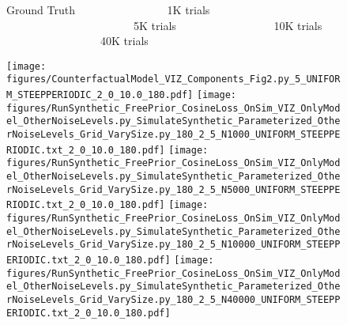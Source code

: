 \documentclass{article}
\begin{document}
\begin{figure}
\begin{comment}
python3 RunSynthetic_FreePrior_CosineLoss_OnSim_VIZ_OnlyModel_OtherNoiseLevels.py 2 0 10.0 180 SimulateSynthetic_Parameterized_OtherNoiseLevels_Grid_VarySize.py_180_2_3_N1000_STEEPPERIODIC_STEEPPERIODIC.txt
python3 RunSynthetic_FreePrior_CosineLoss_OnSim_VIZ_OnlyModel_OtherNoiseLevels.py 2 0 10.0 180 SimulateSynthetic_Parameterized_OtherNoiseLevels_Grid_VarySize.py_180_2_3_N5000_STEEPPERIODIC_STEEPPERIODIC.txt
python3 RunSynthetic_FreePrior_CosineLoss_OnSim_VIZ_OnlyModel_OtherNoiseLevels.py 2 0 10.0 180 SimulateSynthetic_Parameterized_OtherNoiseLevels_Grid_VarySize.py_180_2_3_N10000_STEEPPERIODIC_STEEPPERIODIC.txt
python3 RunSynthetic_FreePrior_CosineLoss_OnSim_VIZ_OnlyModel_OtherNoiseLevels.py 2 0 10.0 180 SimulateSynthetic_Parameterized_OtherNoiseLevels_Grid_VarySize.py_180_2_3_N40000_STEEPPERIODIC_STEEPPERIODIC.txt


python3 RunSynthetic_FreePrior_CosineLoss_OnSim_VIZ_OnlyModel_OtherNoiseLevels.py 2 0 10.0 180 SimulateSynthetic_Parameterized_OtherNoiseLevels_Grid_VarySize.py_180_2_2_N1000_STEEPPERIODIC_STEEPPERIODIC.txt
python3 RunSynthetic_FreePrior_CosineLoss_OnSim_VIZ_OnlyModel_OtherNoiseLevels.py 2 0 10.0 180 SimulateSynthetic_Parameterized_OtherNoiseLevels_Grid_VarySize.py_180_2_2_N5000_STEEPPERIODIC_STEEPPERIODIC.txt
python3 RunSynthetic_FreePrior_CosineLoss_OnSim_VIZ_OnlyModel_OtherNoiseLevels.py 2 0 10.0 180 SimulateSynthetic_Parameterized_OtherNoiseLevels_Grid_VarySize.py_180_2_2_N10000_STEEPPERIODIC_STEEPPERIODIC.txt
python3 RunSynthetic_FreePrior_CosineLoss_OnSim_VIZ_OnlyModel_OtherNoiseLevels.py 2 0 10.0 180 SimulateSynthetic_Parameterized_OtherNoiseLevels_Grid_VarySize.py_180_2_2_N40000_STEEPPERIODIC_STEEPPERIODIC.txt



\end{comment}
\centering

Ground Truth
  \ \  \ \ \ \  \ \  \ \ \ \ \ \ \ \ 
 1K trials
  \ \  \ \  \ \  \ \ \ \ \ \ \ \ \ \ \ \ \ \ \ \ \  
 5K trials
  \ \  \ \  \ \  \ \ \ \ \ \ \ \ \ \ \ 
 10K trials 
 \ \  \ \  \ \  \ \ \ \ \ \ \ \ \ \ \ 
40K trials
\ \ \ \ \ 

\texttt{[image: figures/CounterfactualModel\_VIZ\_Components\_Fig2.py\_5\_UNIFORM\_STEEPPERIODIC\_2\_0\_10.0\_180.pdf]}
\texttt{[image: figures/RunSynthetic\_FreePrior\_CosineLoss\_OnSim\_VIZ\_OnlyModel\_OtherNoiseLevels.py\_SimulateSynthetic\_Parameterized\_OtherNoiseLevels\_Grid\_VarySize.py\_180\_2\_5\_N1000\_UNIFORM\_STEEPPERIODIC.txt\_2\_0\_10.0\_180.pdf]}
\texttt{[image: figures/RunSynthetic\_FreePrior\_CosineLoss\_OnSim\_VIZ\_OnlyModel\_OtherNoiseLevels.py\_SimulateSynthetic\_Parameterized\_OtherNoiseLevels\_Grid\_VarySize.py\_180\_2\_5\_N5000\_UNIFORM\_STEEPPERIODIC.txt\_2\_0\_10.0\_180.pdf]}
\texttt{[image: figures/RunSynthetic\_FreePrior\_CosineLoss\_OnSim\_VIZ\_OnlyModel\_OtherNoiseLevels.py\_SimulateSynthetic\_Parameterized\_OtherNoiseLevels\_Grid\_VarySize.py\_180\_2\_5\_N10000\_UNIFORM\_STEEPPERIODIC.txt\_2\_0\_10.0\_180.pdf]}
\texttt{[image: figures/RunSynthetic\_FreePrior\_CosineLoss\_OnSim\_VIZ\_OnlyModel\_OtherNoiseLevels.py\_SimulateSynthetic\_Parameterized\_OtherNoiseLevels\_Grid\_VarySize.py\_180\_2\_5\_N40000\_UNIFORM\_STEEPPERIODIC.txt\_2\_0\_10.0\_180.pdf]}



\end{figure}
\end{document}
